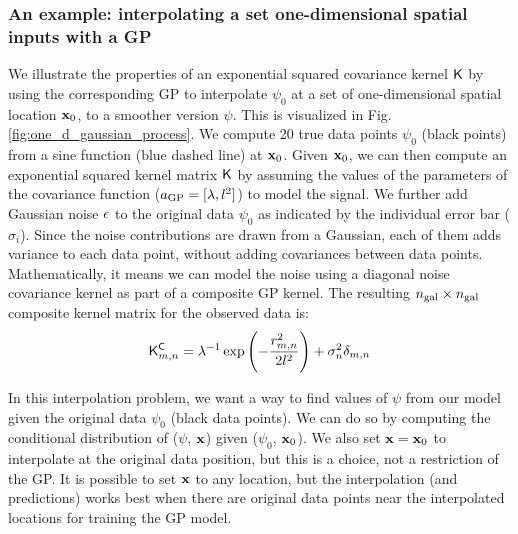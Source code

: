 \subsubsection{An example: interpolating a set one-dimensional spatial inputs
with a GP}
\label{subsubsec:interpolation}
We illustrate the properties of an exponential squared covariance kernel $\mathsf{K}$
by using the corresponding GP to interpolate $\psi_0$  
at a set of one-dimensional spatial location $\mathbf{x}_0$, to a smoother version
$\psi$. 
This is visualized in Fig. \ref{fig:one_d_gaussian_process}.
We compute 20 true data points $\psi_0$ (black points) from a sine function (blue dashed line) at
$\mathbf{x}_0$.
Given $\mathbf{x}_0$, we can then compute an exponential squared kernel matrix $\mathsf{K}$ 
by assuming the values of the parameters of the covariance function
($a_{\rm GP} = [\lambda, l^2]$) to model the signal. 
We further add Gaussian noise ${\bf\epsilon}$ to the original data $\psi_0$ as
indicated by the individual error bar ($\sigma_i$). 
Since the noise contributions are drawn
from a Gaussian,
each of them adds variance to each data point, without adding covariances
between data points.
Mathematically, it means we can model the noise using a diagonal noise 
covariance kernel as part of a composite GP kernel. 
The resulting $n_{\rm gal} \times n_{\rm gal}$ composite kernel matrix for the observed data is:
\begin{equation}
	\mathsf{K}^{\mathsf{C}}_{m, n} = \lambda^{-1} \exp \left(-\frac{r_{m,n}^2}{2
	l^2}\right) + \sigma_n^2
	\delta_{m, n}
\end{equation}

In this interpolation problem, we want a way to find values of $\psi$ from our
model given the original data $\psi_0$ (black data points). We can do so by 
computing the conditional distribution of 
($\psi$, $\mathbf{x}$) given ($\psi_0$, $\mathbf{x}_0$). We also set $\mathbf{x} = \mathbf{x}_0$ to
interpolate at the original data position, but this is a choice, not a
restriction of the GP. It is possible to set $\mathbf{x}$ to any location, but the 
interpolation (and predictions) works best when there are original data points
near the interpolated locations for training the GP model.

